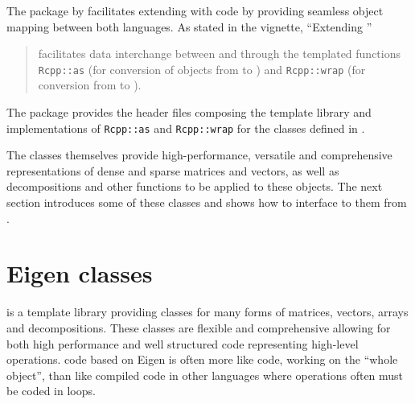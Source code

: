 \documentclass[shortnames,article]{jss}
\begin{document}
The  package by \citet{JSS:Rcpp,CRAN:Rcpp} facilitates extending
 with  code by providing seamless object mapping
between both languages.
%
As stated in the  \citep{CRAN:Rcpp} vignette, ``Extending ''
\begin{quote}
   facilitates data interchange between  and
   through the templated functions \texttt{Rcpp::as} (for
  conversion of objects from  to ) and
  \texttt{Rcpp::wrap} (for conversion from  to ).
\end{quote}
The  package provides the header files composing the
  template library and implementations of
\texttt{Rcpp::as} and \texttt{Rcpp::wrap} for the 
classes defined in .

The  classes themselves provide high-performance,
versatile and comprehensive representations of dense and sparse
matrices and vectors, as well as decompositions and other functions
to be applied to these objects.  The next section introduces some
of these classes and shows how to interface to them from .

\section{Eigen classes}
\label{sec:eclasses}

 \citep*{Eigen:Web} is a  template
library providing classes for many forms of matrices, vectors, arrays
and decompositions.  These classes are flexible and comprehensive
allowing for both high performance and well structured code
representing high-level operations.  code based on Eigen
is often more like  code, working on the ``whole object'',
than like compiled code in other languages where operations often must be
coded in loops.
\end{document}

